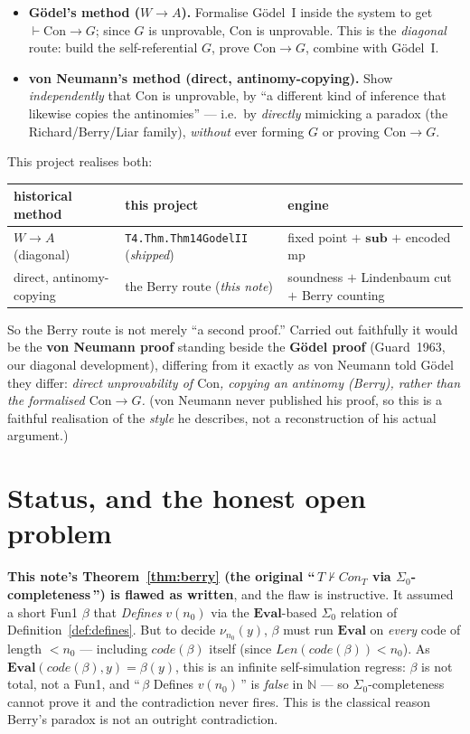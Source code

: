 \documentclass[11pt]{article}
\theoremstyle{plain}
\theoremstyle{definition}
\theoremstyle{remark}
\newcommand{\code}[1]{\mathit{code}(#1)}
\newcommand{\Con}{\mathit{Con}}
\newcommand{\Len}{\mathit{Len}}
\newcommand{\Eval}{\mathbf{Eval}}
\begin{document}
\begin{itemize}
\item \textbf{G\"odel's method ($W \to A$).}  Formalise G\"odel~I inside
the system to get $\vdash \mathrm{Con} \to G$; since $G$ is unprovable,
$\mathrm{Con}$ is unprovable.  This is the \emph{diagonal} route: build
the self-referential $G$, prove $\mathrm{Con}\to G$, combine with
G\"odel~I.

\item \textbf{von Neumann's method (direct, antinomy-copying).}  Show
\emph{independently} that $\mathrm{Con}$ is unprovable, by ``a different
kind of inference that likewise copies the antinomies'' --- i.e.\ by
\emph{directly} mimicking a paradox (the Richard/Berry/Liar family),
\emph{without} ever forming $G$ or proving $\mathrm{Con}\to G$.
\end{itemize}

This project realises both:

\begin{center}
\begin{tabular}{lll}
\hline
historical method & this project & engine \\
\hline
$W \to A$ (diagonal) & \texttt{T4.Thm.Thm14GodelII} (\emph{shipped}) & fixed point $+$ $\mathbf{sub}$ $+$ encoded mp \\
direct, antinomy-copying & the Berry route (\emph{this note}) & soundness $+$ Lindenbaum cut $+$ Berry counting \\
\hline
\end{tabular}
\end{center}

So the Berry route is not merely ``a second proof.''  Carried out
faithfully it would be the \textbf{von Neumann proof} standing beside
the \textbf{G\"odel proof} (Guard~1963, our diagonal development),
differing from it exactly as von Neumann told G\"odel they differ:
\emph{direct unprovability of $\mathrm{Con}$, copying an antinomy
(Berry), rather than the formalised $\mathrm{Con}\to G$.}  (von Neumann
never published his proof, so this is a faithful realisation of the
\emph{style} he describes, not a reconstruction of his actual argument.)

\section{Status, and the honest open problem}
\label{sec:status}

\textbf{This note's Theorem~\ref{thm:berry} (the original
``\,$T \not\vdash \Con_T$ via $\Sigma_0$-completeness\,'') is flawed as
written}, and the flaw is instructive.  It assumed a short Fun1
$\beta$ that \emph{Defines} $v(n_0)$ via the $\Eval$-based $\Sigma_0$
relation of Definition~\ref{def:defines}.  But to decide
$\nu_{n_0}(y)$, $\beta$ must run $\Eval$ on \emph{every} code of length
$< n_0$ --- including $\code{\beta}$ itself (since $\Len(\code\beta) <
n_0$).  As $\Eval(\code\beta, y) = \beta(y)$, this is an infinite
self-simulation regress: $\beta$ is not total, not a Fun1, and
``\,$\beta$ Defines $v(n_0)$\,'' is \emph{false} in $\mathbb{N}$ --- so
$\Sigma_0$-completeness cannot prove it and the contradiction never
fires.  This is the classical reason Berry's paradox is not an
outright contradiction.
\end{document}
